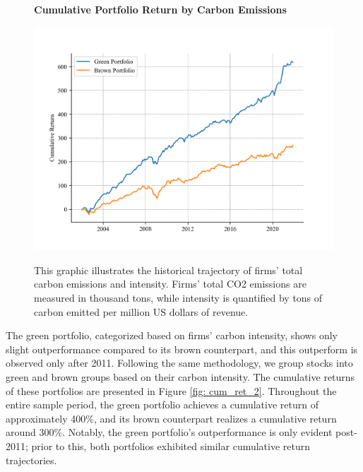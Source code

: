 \documentclass[12pt]{article}
\begin{document}
\begin{figure}[!ht]
\centering
\caption{\textbf{Cumulative Portfolio Return by Carbon Emissions}}
\includegraphics{graphics/green_brown_co2.png}
\label{fig: cum_ret_1}
\caption*{\footnotesize{This graphic illustrates the historical trajectory of firms' total carbon emissions and intensity. Firms' total CO2 emissions are measured in thousand tons, while intensity is quantified by tons of carbon emitted per million US dollars of revenue.}}
\end{figure}

The green portfolio, categorized based on firms' carbon intensity, shows only slight outperformance compared to its brown counterpart, and this outperform is observed only after 2011. Following the same methodology, we group stocks into green and brown groups based on their carbon intensity. The cumulative returns of these portfolios are presented in Figure \ref{fig: cum_ret_2}. Throughout the entire sample period, the green portfolio achieves a cumulative return of approximately 400\%, and its brown counterpart realizes a cumulative return around 300\%. Notably, the green portfolio's outperformance is only evident post-2011; prior to this, both portfolios exhibited similar cumulative return trajectories.
\end{document}
